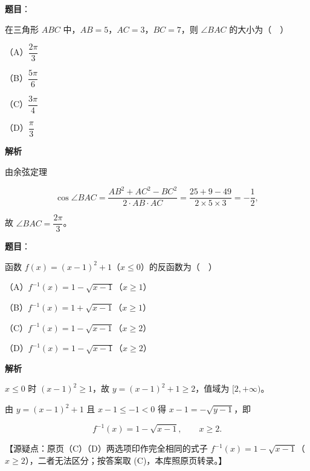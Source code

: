 \begin{answer}

\textbf{题目}：

在三角形 $ABC$ 中，$AB=5$，$AC=3$，$BC=7$，则 $\angle BAC$ 的大小为（　）

（A）$\dfrac{2\pi}{3}$

（B）$\dfrac{5\pi}{6}$

（C）$\dfrac{3\pi}{4}$

（D）$\dfrac{\pi}{3}$

\textbf{解析}

由余弦定理

\nopagebreak[4]
\[\cos\angle BAC=\frac{AB^2+AC^2-BC^2}{2\cdot AB\cdot AC}=\frac{25+9-49}{2\times5\times3}=-\frac12,\]

故 $\angle BAC=\dfrac{2\pi}3$。


\end{answer}
\begin{answer}

\textbf{题目}：

函数 $f(x)=(x-1)^2+1$（$x\leqslant0$）的反函数为（　）

（A）$f^{-1}(x)=1-\sqrt{x-1}$（$x\geqslant1$）

（B）$f^{-1}(x)=1+\sqrt{x-1}$（$x\geqslant1$）

（C）$f^{-1}(x)=1-\sqrt{x-1}$（$x\geqslant2$）

（D）$f^{-1}(x)=1-\sqrt{x-1}$（$x\geqslant2$）

\textbf{解析}

$x\leqslant0$ 时 $(x-1)^2\geqslant1$，故 $y=(x-1)^2+1\geqslant2$，值域为 $[2,+\infty)$。

由 $y=(x-1)^2+1$ 且 $x-1\leqslant-1<0$ 得 $x-1=-\sqrt{y-1}$，即

\nopagebreak[4]
\[f^{-1}(x)=1-\sqrt{x-1},\qquad x\geqslant2.\]

【源疑点：原页（C）（D）两选项印作完全相同的式子 $f^{-1}(x)=1-\sqrt{x-1}$（$x\geqslant2$），二者无法区分；按答案取 (C)，本库照原页转录。】


\end{answer}
